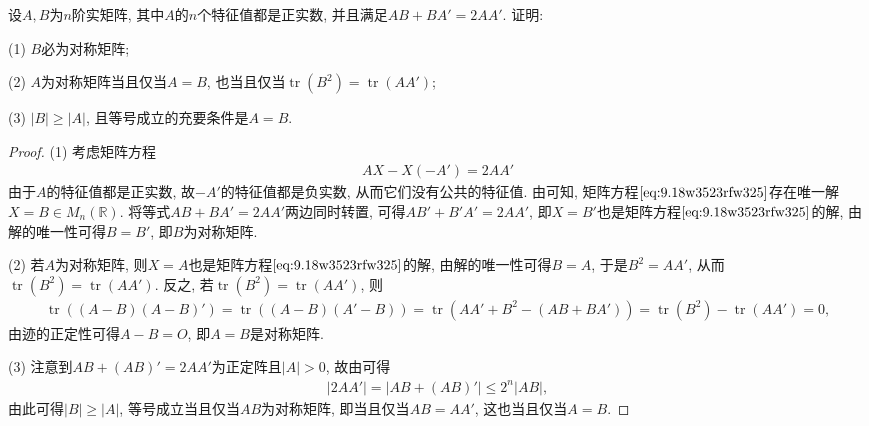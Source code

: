 \documentclass[../../main.tex]{subfiles}%
\begin{document}
\begin{example}
设\( A,B \)为\( n \)阶实矩阵, 其中\( A \)的\( n \)个特征值都是正实数, 并且满足\( AB + BA' = 2AA' \). 证明:

(1) \( B \)必为对称矩阵;

(2) \( A \)为对称矩阵当且仅当\( A = B \), 也当且仅当\( \operatorname{tr}(B^2) = \operatorname{tr}(AA') \);

(3) \( |B| \geqslant |A| \), 且等号成立的充要条件是\( A = B \).
\end{example}
\begin{proof}

(1) 考虑矩阵方程
\begin{align}\label{eq:9.18w3523rfw325}
AX - X(-A') = 2AA'
\end{align}
由于\( A \)的特征值都是正实数, 故\( -A' \)的特征值都是负实数, 从而它们没有公共的特征值. 由可知, 矩阵方程\(\eqref{eq:9.18w3523rfw325}\)存在唯一解\( X = B \in M_n(\mathbb{R}) \). 将等式\( AB + BA' = 2AA' \)两边同时转置, 可得\( AB' + B'A' = 2AA' \), 即\( X = B' \)也是矩阵方程\(\eqref{eq:9.18w3523rfw325}\)的解, 由解的唯一性可得\( B = B' \), 即\( B \)为对称矩阵.

(2) 若\( A \)为对称矩阵, 则\( X = A \)也是矩阵方程\(\eqref{eq:9.18w3523rfw325}\)的解, 由解的唯一性可得\( B = A \), 于是\( B^2 = AA' \), 从而\( \operatorname{tr}(B^2) = \operatorname{tr}(AA') \). 反之, 若\( \operatorname{tr}(B^2) = \operatorname{tr}(AA') \), 则
\begin{align*}
\operatorname{tr}\left((A - B)(A - B)'\right) = \operatorname{tr}\left((A - B)(A' - B)\right) = \operatorname{tr}\left(AA' + B^2 - (AB + BA')\right) = \operatorname{tr}(B^2) - \operatorname{tr}(AA') = 0,
\end{align*}
由迹的正定性可得\( A - B = O \), 即\( A = B \)是对称矩阵.

(3) 注意到\( AB + (AB)' = 2AA' \)为正定阵且\( |A| > 0 \), 故由可得
\begin{align*}
|2AA' |=\left| AB+(AB)' \right|\leqslant 2^n|AB|, 
\end{align*}
由此可得\( |B| \geqslant |A| \), 等号成立当且仅当\( AB \)为对称矩阵, 即当且仅当\( AB = AA' \), 这也当且仅当\( A = B \). 

\end{proof}
\end{document}
